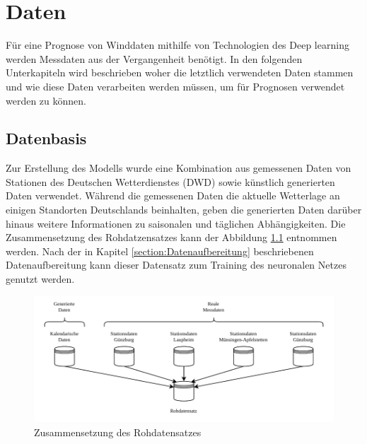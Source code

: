 \documentclass[
12pt, %
toc=listofnumbered, %
toc=chapterentrydotfill, %
numbers=noenddot, %
captions=tableheading, %
bibliography=numbered
]{scrreprt}
\let\Oldsection\section
\renewcommand{\section}{\FloatBarrier\Oldsection}
\begin{document}
\chapter{Daten}

Für eine Prognose von Winddaten mithilfe von Technologien des Deep learning werden Messdaten aus der Vergangenheit benötigt. 
In den folgenden Unterkapiteln wird beschrieben woher die letztlich verwendeten Daten stammen und wie diese Daten verarbeiten werden müssen, um für Prognosen verwendet werden zu können.

\section{Datenbasis}\label{section:datenbasis}
Zur Erstellung des Modells wurde eine Kombination aus gemessenen Daten von Stationen des Deutschen Wetterdienstes (DWD) sowie künstlich generierten Daten verwendet.
Während die gemessenen Daten die aktuelle Wetterlage an einigen Standorten Deutschlands beinhalten, geben die generierten Daten darüber hinaus weitere Informationen zu saisonalen und täglichen Abhängigkeiten. Die Zusammensetzung des Rohdatzensatzes kann der Abbildung \ref{fig:rohdatensatz} entnommen werden. Nach der in Kapitel \ref{section:Datenaufbereitung} beschriebenen Datenaufbereitung kann dieser Datensatz zum Training des neuronalen Netzes genutzt werden.

\begin{figure}[tph]
	\begin{center}
		\includegraphics[]{./images/rohdatensatz.pdf}
		\caption{Zusammensetzung des Rohdatensatzes}
		\label{fig:rohdatensatz}
	\end{center}
\end{figure}
\end{document}
